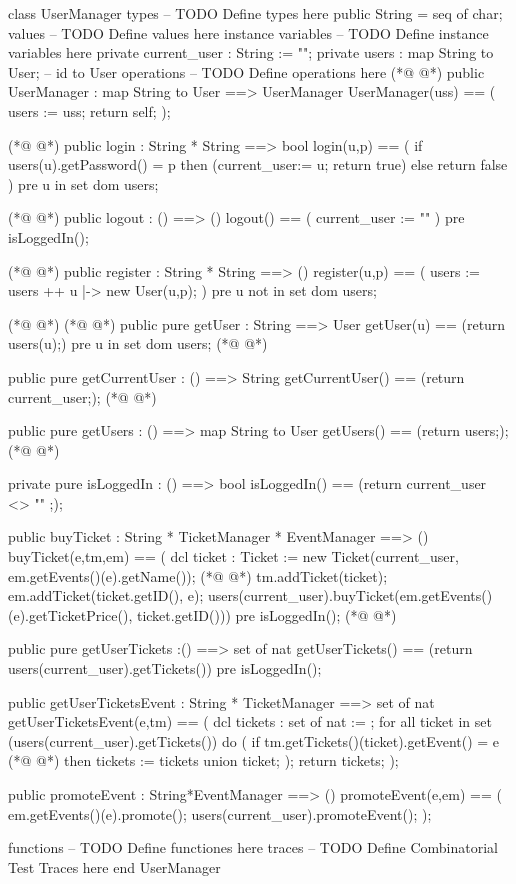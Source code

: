 \begin{vdmpp}[breaklines=true]
class UserManager
types
-- TODO Define types here
 public String = seq of char;
values
-- TODO Define values here
instance variables
-- TODO Define instance variables here
  private current_user : String := "";
 private users : map String to User; -- id to User
operations
-- TODO Define operations here
(*@
\label{UserManager:13}
@*)
 public UserManager : map String to User ==> UserManager
 UserManager(uss) == (
  users := uss;
  return self;
 );
 
(*@
\label{login:19}
@*)
 public login : String * String ==> bool
 login(u,p) == (
  if users(u).getPassword() = p
  then (current_user:= u; return true)
  else return false
 )
 pre u in set dom users;
 
(*@
\label{logout:27}
@*)
 public logout : () ==> ()
 logout() == (
  current_user := ""
 )
 pre isLoggedIn();
 
(*@
\label{register:33}
@*)
 public register : String * String ==> ()
 register(u,p) == (
  users := users ++ {u |-> new User(u,p)};
 )
 pre u not in set dom users;
 
(*@
\label{getCurrentUser:39}
@*)
(*@
\label{getUser:39}
@*)
 public pure getUser : String ==> User
 getUser(u) == (return users(u);)
 pre u in set dom users;
(*@
\label{getUsers:42}
@*)

 public pure getCurrentUser : () ==> String
 getCurrentUser() == (return current_user;);
(*@
\label{isLoggedIn:45}
@*)
 
 public pure getUsers : () ==> map String to User
 getUsers() == (return users;);
(*@
\label{buyTicket:48}
@*)
 
 private pure isLoggedIn : () ==> bool
 isLoggedIn() == (return current_user <> "" ;);
 
 public buyTicket : String * TicketManager * EventManager ==> ()
 buyTicket(e,tm,em) == (
 dcl ticket : Ticket := new Ticket(current_user, em.getEvents()(e).getName());
(*@
\label{getUserTickets:55}
@*)
 tm.addTicket(ticket);
 em.addTicket(ticket.getID(), e);
 users(current_user).buyTicket(em.getEvents()(e).getTicketPrice(), ticket.getID()))
 pre isLoggedIn();
(*@
\label{getUserTicketsEvent:59}
@*)
 
 public pure getUserTickets :() ==> set of nat
 getUserTickets() == (return users(current_user).getTickets())
 pre isLoggedIn();
 
 public getUserTicketsEvent : String * TicketManager ==> set of nat
 getUserTicketsEvent(e,tm) == (
  dcl tickets : set of nat := {};
  for all ticket in set (users(current_user).getTickets()) do 
  (
   if tm.getTickets()(ticket).getEvent() = e
(*@
\label{promoteEvent:70}
@*)
    then tickets := tickets union {ticket};
  );
  return tickets;
 );
 
 public promoteEvent : String*EventManager ==> ()
 promoteEvent(e,em) == (
  em.getEvents()(e).promote();
  users(current_user).promoteEvent();
 );
 
 
 
functions
-- TODO Define functiones here
traces
-- TODO Define Combinatorial Test Traces here
end UserManager
\end{vdmpp}
